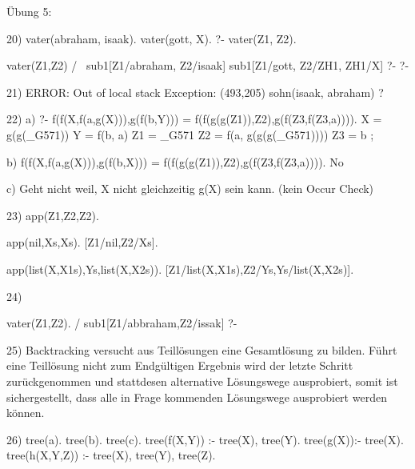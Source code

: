 Übung 5:

20)
vater(abraham, isaak).
vater(gott, X).
?- vater(Z1, Z2).

						vater(Z1,Z2)
						/         \
sub1[Z1/abraham, Z2/isaak]		sub1[Z1/gott, Z2/ZH1, ZH1/X]
?-								?-


21)
ERROR: Out of local stack
Exception: (493,205) sohn(isaak, abraham) ? 


22)
a)
?- f(f(X,f(a,g(X))),g(f(b,Y))) = f(f(g(g(Z1)),Z2),g(f(Z3,f(Z3,a)))).
X = g(g(_G571))
Y = f(b, a)
Z1 = _G571
Z2 = f(a, g(g(g(_G571))))
Z3 = b ;

b)
f(f(X,f(a,g(X))),g(f(b,X))) = f(f(g(g(Z1)),Z2),g(f(Z3,f(Z3,a)))).
No

c)
Geht nicht weil, X nicht gleichzeitig g(X) sein kann. (kein Occur Check)


23)
app(Z1,Z2,Z2).

app(nil,Xs,Xs).
[Z1/nil,Z2/Xs].

app(list(X,X1s),Ys,list(X,X2s)).
[Z1/list(X,X1s),Z2/Ys,Ys/list(X,X2s)].


24)

						vater(Z1,Z2).
						/
sub1[Z1/abbraham,Z2/issak]
?-


25)
Backtracking versucht aus Teillösungen eine Gesamtlösung zu bilden. Führt eine Teillösung nicht zum Endgültigen Ergebnis wird 
der letzte Schritt zurückgenommen und stattdesen alternative Lösungswege ausprobiert, somit ist sichergestellt, dass alle in Frage 
kommenden Lösungswege ausprobiert werden können.


26)
tree(a).
tree(b).
tree(c).
tree(f(X,Y)) :- tree(X), tree(Y).
tree(g(X)):- tree(X).
tree(h(X,Y,Z)) :- tree(X), tree(Y), tree(Z).